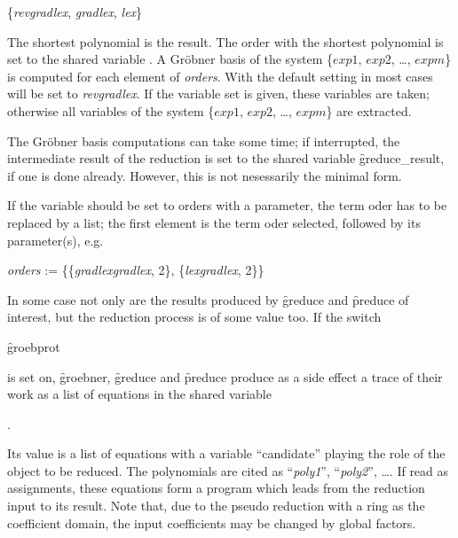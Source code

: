 \begin{center}
\{\emph{revgradlex}, \emph{gradlex}, \emph{lex}\}
\end{center}

The shortest polynomial is the result.
The order with the shortest polynomial is set to the shared variable
. A Gr\"obner basis of the system \{$exp1$, $exp2$, \ldots ,
$expm$\} is computed for each element of \emph{orders}.
With the default setting  in most cases will be set
to \textit{revgradlex}.
If the variable set is given, these variables are taken; otherwise all
variables of the system \{$exp1$, $exp2$, \ldots , $expm$\} are
extracted.

\hypertarget{reserved:GREDUCE_RESULT}{}
The Gr\"obner basis computations can take some time; if interrupted, the
intermediate result of the reduction is set to the shared variable
\f{greduce\_result}, if one is done already. However, this is not
nesessarily the minimal form.

If the variable  should be set to orders with a parameter,
the term oder has to be replaced by a list; the first element is the
term oder selected, followed by its parameter(s), e.g.

\begin{center}
\emph{orders} := \{\{\emph{gradlexgradlex}, 2\}, \{\emph{lexgradlex}, 2\}\}
\end{center}

In some case not only are the results produced by \f{greduce} and
\f{preduce} of interest, but the reduction process is of some value
too. If the switch
\hypertarget{switch:GROEBPROT}{}
\begin{center}
\f{groebprot}
\end{center}
is set on, \f{groebner}, \f{greduce} and \f{preduce} produce as a side effect
a trace of their work as a \REDUCE list of equations in the shared variable
\hypertarget{reserved:GROEBPROTFILE}{}
\begin{center}
.
\end{center}
Its value is a list of equations with a variable ``candidate'' playing
the role of the object to be reduced. The polynomials are cited as
``\emph{poly1}'', ``\emph{poly2}'', \ldots\;. If read as assignments, these equations
form a program which leads from the reduction input to its result.
Note that, due to the pseudo reduction with a ring as the coefficient
domain, the input coefficients may be changed by global factors.

